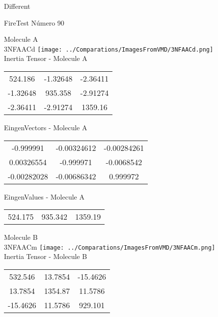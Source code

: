 \begin{center}
\vtab
\vtab
\textcolor{NavyBlue}{\Large Different}
\end{center}

 \newpage

\vtab[-2cm]
\begin{center}
{\large FireTest \tab Número 90}
\end{center}
\begin{multicols}{2}
\begin{center}

Molecule A \\ 
3NFAACd
\texttt{[image: ../Comparations/ImagesFromVMD/3NFAACd.png]}
\\
Inertia Tensor - Molecule A \\
\vtab

\begin{tabular}{|c c c|}
524.186	 & 	-1.32648	 & 	-2.36411	 \\
-1.32648	 & 	935.358	 & 	-2.91274	 \\
-2.36411	 & 	-2.91274	 & 	1359.16
\end{tabular}

\vtab
 EingenVectors - Molecule A     \\
\vtab
\begin{tabular}{|c c c|}
-0.999991	 & 	-0.00324612	 & 	-0.00284261	 \\
0.00326554	 & 	-0.999971	 & 	-0.0068542	 \\
-0.00282028	 & 	-0.00686342	 & 	0.999972
\end{tabular}

\vtab
 EingenValues - Molecule A     \\
\vtab
\begin{tabular}{|c c c|}
524.175	 & 	935.342	 & 	1359.19	 \\
\end{tabular}
\columnbreak

Molecule B \\ 
3NFAACm
\texttt{[image: ../Comparations/ImagesFromVMD/3NFAACm.png]}
\\
Inertia Tensor - Molecule B \\
\vtab

\begin{tabular}{|c c c|}
532.546	 & 	13.7854	 & 	-15.4626	 \\
13.7854	 & 	1354.87	 & 	11.5786	 \\
-15.4626	 & 	11.5786	 & 	929.101
\end{tabular}


\end{center}
\end{multicols}
